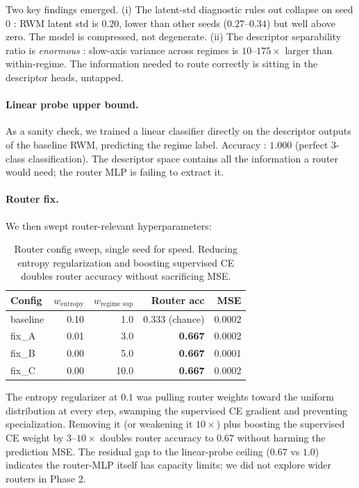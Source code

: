 \documentclass[11pt,a4paper]{article}
\begin{document}
Two key findings emerged. (i) The latent-std diagnostic rules out
collapse on seed 0 : RWM latent std is $0.20$, lower than other
seeds ($0.27$--$0.34$) but well above zero. The model is compressed,
not degenerate. (ii) The descriptor separability ratio is
\emph{enormous} : slow-axis variance across regimes is $10$--$175\times$
larger than within-regime. The information needed to route correctly
is sitting in the descriptor heads, untapped.

\paragraph{Linear probe upper bound.} As a sanity check, we trained a
linear classifier directly on the descriptor outputs of the baseline
RWM, predicting the regime label. Accuracy : $1.000$ (perfect 3-class
classification). The descriptor space contains all the information a
router would need; the router MLP is failing to extract it.

\paragraph{Router fix.} We then swept router-relevant hyperparameters:

\begin{table}[h]
\centering
\caption{Router config sweep, single seed for speed. Reducing entropy
regularization and boosting supervised CE doubles router accuracy
without sacrificing MSE.}
\label{tab:rwm-router-fix}
\begin{tabular}{lrrrr}
\toprule
Config & $w_{\text{entropy}}$ & $w_{\text{regime sup}}$ & Router acc & MSE \\
\midrule
baseline & 0.10 & 1.0  & 0.333 (chance) & 0.0002 \\
fix\_A   & 0.01 & 3.0  & \textbf{0.667} & 0.0002 \\
fix\_B   & 0.00 & 5.0  & \textbf{0.667} & 0.0001 \\
fix\_C   & 0.00 & 10.0 & \textbf{0.667} & 0.0002 \\
\bottomrule
\end{tabular}
\end{table}

The entropy regularizer at $0.1$ was pulling router weights toward
the uniform distribution at every step, swamping the supervised CE
gradient and preventing specialization. Removing it (or weakening
it $10\times$) plus boosting the supervised CE weight by $3$--$10\times$
doubles router accuracy to $0.67$ without harming the prediction
MSE. The residual gap to the linear-probe ceiling ($0.67$ vs $1.0$)
indicates the router-MLP itself has capacity limits; we did not
explore wider routers in Phase 2.
\end{document}
